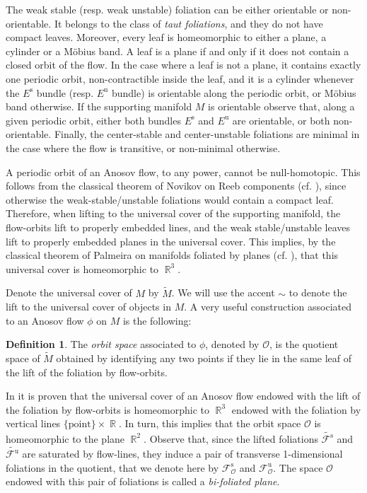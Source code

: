 \documentclass[12pt]{amsart}
\theoremstyle{definition}
\newtheorem{definition}[theorem]{Definition}
\theoremstyle{remark}
\DeclareMathOperator{\R}{\mathbb{R}}
\renewcommand{\O}{\mathcal{O}}
\newcommand{\Es}{E^{\mathrm{s}}}
\newcommand{\Eu}{E^{\mathrm{u}}}
\newcommand{\Fcs}{\mathcal{F}^{\mathrm{s}}}
\newcommand{\Fcu}{\mathcal{F}^{\mathrm{u}}}
\newcommand{\Fs}{\mathcal{F}^{\mathrm{s}}_\mathcal{O}}
\newcommand{\Fu}{\mathcal{F}^{\mathrm{u}}_\mathcal{O}}
\begin{document}
The  weak stable (resp. weak unstable) foliation can be either orientable or non-orientable. It belongs to the class of \emph{taut foliations}, and they do not have compact leaves. Moreover, every leaf is homeomorphic to either a plane, a cylinder or a M\"obius band. A leaf is a plane if and only if it does not contain a closed orbit of the flow. In the case where a leaf is not a plane, it contains exactly one periodic orbit, non-contractible inside the leaf, and it is a cylinder whenever the $\Es$ bundle (resp. $\Eu$ bundle) is orientable along the periodic orbit, or M\"obius band otherwise. If the supporting manifold $M$ is orientable observe that, along a given periodic orbit, either both bundles $\Es$ and $\Eu$ are orientable, or both non-orientable. Finally, the center-stable and center-unstable foliations are minimal in the case where the flow is transitive, or non-minimal otherwise. 


A periodic orbit of an Anosov flow, to any power, cannot be null-homotopic. This follows from the classical theorem of Novikov on Reeb components (cf. \cite{Novikov1965Foliations}), since otherwise the weak-stable/unstable foliations would contain a compact leaf. Therefore, when lifting to the universal cover of the supporting manifold, the flow-orbits lift to properly embedded lines, and the weak stable/unstable leaves lift to properly embedded planes in the universal cover. This implies, by the classical theorem of Palmeira on manifolds foliated by planes (cf. \cite{Palmeira1978}), that this universal cover is homeomorphic to $\R^3$. 


Denote the universal cover of $M$ by $\widetilde{M}$. We will use the accent $\sim$ to denote the lift to the universal cover of objects in $M$. A very useful construction associated to an Anosov flow $\phi$ on $M$ is the following:


\begin{definition}
The \emph{orbit space} associated to $\phi$, denoted by $\O$, is the quotient space of $\tilde M$ obtained by identifying any two points if they lie in the same leaf of the lift of the foliation by flow-orbits. 
\end{definition}


In \cite{Fenley1994AnosovFlows, Barbot1995Characterization} it is proven that the universal cover of an Anosov flow endowed with the lift of the foliation by flow-orbits is homeomorphic to $\R^3$ endowed with the foliation by vertical lines $\{\text{point}\}\times\R$. In turn, this implies that the orbit space $\O$ is homeomorphic to the plane $\R^2$. Observe that, since the lifted foliations $\tilde{\Fcs}$ and $\tilde{\Fcu}$ are saturated by flow-lines, they induce a pair of transverse 1-dimensional foliations in the quotient, that we denote here by $\Fs$ and $\Fu$. The space $\O$ endowed with this pair of foliations is called a \emph{bi-foliated plane}.
\end{document}
